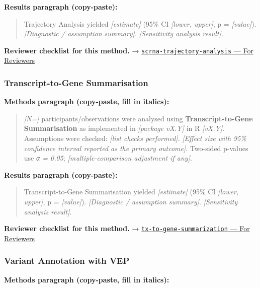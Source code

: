 \documentclass[
]{article}
\begin{document}
\textbf{Results paragraph (copy-paste):}

\begin{quote}
Trajectory Analysis yielded \emph{{[}estimate{]}} (95\% CI
\emph{{[}lower, upper{]}}, p = \emph{{[}value{]}}). \emph{{[}Diagnostic
/ assumption summary{]}}. \emph{{[}Sensitivity analysis result{]}}.
\end{quote}

\textbf{Reviewer checklist for this method.} →
\href{../chapters/12-bioinformatics/scrna-trajectory-analysis.Rmd\#for-reviewers}{\texttt{scrna-trajectory-analysis}
--- For Reviewers}

\subsubsection{Transcript-to-Gene
Summarisation}\label{transcript-to-gene-summarisation}

\textbf{Methods paragraph (copy-paste, fill in italics):}

\begin{quote}
\emph{{[}N={]}} participants/observations were analysed using
\textbf{Transcript-to-Gene Summarisation} as implemented in
\emph{{[}package vX.Y{]}} in R \emph{{[}vX.Y{]}}. Assumptions were
checked: \emph{{[}list checks performed{]}}. \emph{{[}Effect size with
95\% confidence interval reported as the primary outcome{]}}. Two-sided
p-values use \emph{α = 0.05}; \emph{{[}multiple-comparison adjustment if
any{]}}.
\end{quote}

\textbf{Results paragraph (copy-paste):}

\begin{quote}
Transcript-to-Gene Summarisation yielded \emph{{[}estimate{]}} (95\% CI
\emph{{[}lower, upper{]}}, p = \emph{{[}value{]}}). \emph{{[}Diagnostic
/ assumption summary{]}}. \emph{{[}Sensitivity analysis result{]}}.
\end{quote}

\textbf{Reviewer checklist for this method.} →
\href{../chapters/12-bioinformatics/tx-to-gene-summarization.Rmd\#for-reviewers}{\texttt{tx-to-gene-summarization}
--- For Reviewers}

\subsubsection{Variant Annotation with
VEP}\label{variant-annotation-with-vep}

\textbf{Methods paragraph (copy-paste, fill in italics):}
\end{document}
